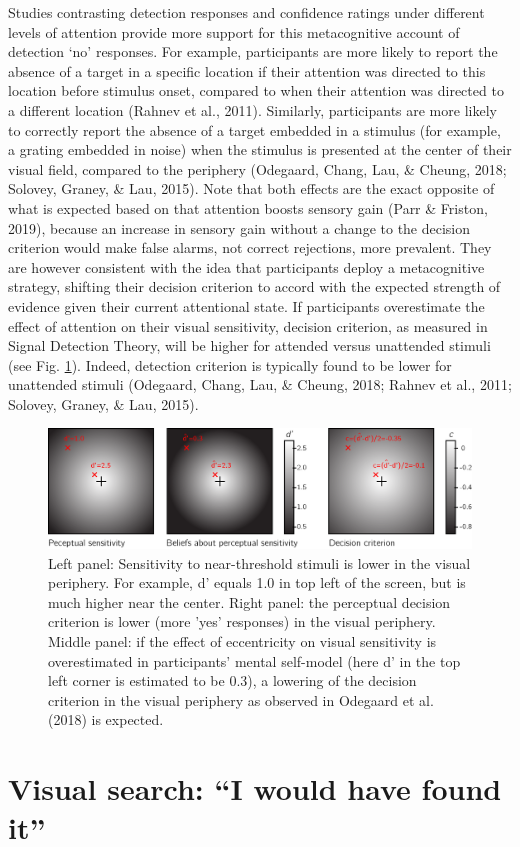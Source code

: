 \documentclass[12pt,twoside]{reedthesis}
\begin{document}
Studies contrasting detection responses and confidence ratings under different levels of attention provide more support for this metacognitive account of detection `no' responses. For example, participants are more likely to report the absence of a target in a specific location if their attention was directed to this location before stimulus onset, compared to when their attention was directed to a different location (Rahnev et al., 2011). Similarly, participants are more likely to correctly report the absence of a target embedded in a stimulus (for example, a grating embedded in noise) when the stimulus is presented at the center of their visual field, compared to the periphery (Odegaard, Chang, Lau, \& Cheung, 2018; Solovey, Graney, \& Lau, 2015). Note that both effects are the exact opposite of what is expected based on that attention boosts sensory gain (Parr \& Friston, 2019), because an increase in sensory gain without a change to the decision criterion would make false alarms, not correct rejections, more prevalent. They are however consistent with the idea that participants deploy a metacognitive strategy, shifting their decision criterion to accord with the expected strength of evidence given their current attentional state. If participants overestimate the effect of attention on their visual sensitivity, decision criterion, as measured in Signal Detection Theory, will be higher for attended versus unattended stimuli (see Fig. \ref{fig:intro-detection}). Indeed, detection criterion is typically found to be lower for unattended stimuli (Odegaard, Chang, Lau, \& Cheung, 2018; Rahnev et al., 2011; Solovey, Graney, \& Lau, 2015).
\begin{figure}
\includegraphics[width=1\linewidth]{figure/intro/detection} \caption[The effect of erroneous beliefs about perceptual sensitivity on decision criterion]{Left panel: Sensitivity to near-threshold stimuli is lower in the visual periphery. For example, d' equals 1.0 in top left of the screen, but is much higher near the center. Right panel: the perceptual decision criterion is lower (more 'yes' responses) in the visual periphery.  Middle panel: if the effect of eccentricity on visual sensitivity is overestimated in participants' mental self-model (here d' in the top left corner is estimated to be 0.3), a lowering of the decision criterion in the visual periphery as observed in Odegaard et al. (2018) is expected.}\label{fig:intro-detection}
\end{figure}
\hypertarget{intro:search}{%
\section{Visual search: ``I would have found it''}\label{intro:search}}
\end{document}
